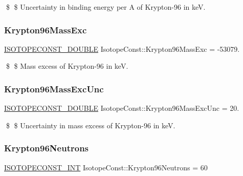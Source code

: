 \$ \$ Uncertainty in binding energy per A of Krypton-\/96 in keV. \mbox{\label{group___isotope_const-_krypton-_kr96_gafc73ae8742c04efacc086f4900e55acc}} 
\subsubsection{\texorpdfstring{Krypton96\+Mass\+Exc}{Krypton96MassExc}}
{\footnotesize\ttfamily \mbox{\hyperlink{group___isotope_const-_macros_ga8f45a7272ce02c0b4c65c44636ed719a}{I\+S\+O\+T\+O\+P\+E\+C\+O\+N\+S\+T\+\_\+\+D\+O\+U\+B\+LE}} Isotope\+Const\+::\+Krypton96\+Mass\+Exc = -\/53079.}

\$ \$ Mass excess of Krypton-\/96 in keV. \mbox{\label{group___isotope_const-_krypton-_kr96_gaf5babafdb4523c610bd8b5fbbb2f3201}} 
\subsubsection{\texorpdfstring{Krypton96\+Mass\+Exc\+Unc}{Krypton96MassExcUnc}}
{\footnotesize\ttfamily \mbox{\hyperlink{group___isotope_const-_macros_ga8f45a7272ce02c0b4c65c44636ed719a}{I\+S\+O\+T\+O\+P\+E\+C\+O\+N\+S\+T\+\_\+\+D\+O\+U\+B\+LE}} Isotope\+Const\+::\+Krypton96\+Mass\+Exc\+Unc = 20.}

\$ \$ Uncertainty in mass excess of Krypton-\/96 in keV. \mbox{\label{group___isotope_const-_krypton-_kr96_gae122921704650e51aee67cb574e416d8}} 
\subsubsection{\texorpdfstring{Krypton96\+Neutrons}{Krypton96Neutrons}}
{\footnotesize\ttfamily \mbox{\hyperlink{group___isotope_const-_macros_ga5f18360b3e99483a35c32d789e62621c}{I\+S\+O\+T\+O\+P\+E\+C\+O\+N\+S\+T\+\_\+\+I\+NT}} Isotope\+Const\+::\+Krypton96\+Neutrons = 60}

